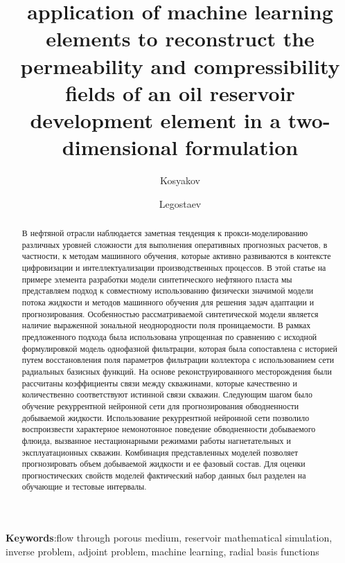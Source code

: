 \documentclass{article}
\begin{document}
\title{application of machine learning elements to reconstruct the permeability and compressibility fields of an oil reservoir development element in a two-dimensional formulation} %
\author{Kosyakov} %
\author{Legostaev}




\begin{abstract} %
В нефтяной отрасли наблюдается заметная тенденция к прокси-моделированию различных уровней сложности для выполнения оперативных прогнозных расчетов, в частности, к методам машинного обучения, которые активно развиваются в контексте цифровизации и интеллектуализации производственных процессов. В этой статье на примере элемента разработки модели синтетического нефтяного пласта мы представляем подход к совместному использованию физически значимой модели потока жидкости и методов машинного обучения для решения задач адаптации и прогнозирования. Особенностью рассматриваемой синтетической модели является наличие выраженной зональной неоднородности поля проницаемости. В рамках предложенного подхода была использована упрощенная по сравнению с исходной формулировкой модель однофазной фильтрации, которая была сопоставлена с историей путем восстановления поля параметров фильтрации коллектора с использованием сети радиальных базисных функций. На основе реконструированного месторождения были рассчитаны коэффициенты связи между скважинами, которые качественно и количественно соответствуют истинной связи скважин. Следующим шагом было обучение рекуррентной нейронной сети для прогнозирования обводненности добываемой жидкости. Использование рекуррентной нейронной сети позволило воспроизвести характерное немонотонное поведение обводненности добываемого флюида, вызванное нестационарными режимами работы нагнетательных и эксплуатационных скважин. Комбинация представленных моделей позволяет прогнозировать объем добываемой жидкости и ее фазовый состав. Для оценки прогностических свойств моделей фактический набор данных был разделен на обучающие и тестовые интервалы.
\end{abstract}

\textbf{Keywords}:flow through porous medium, reservoir mathematical simulation, inverse problem, adjoint problem, machine learning, radial basis functions%
\end{document}
